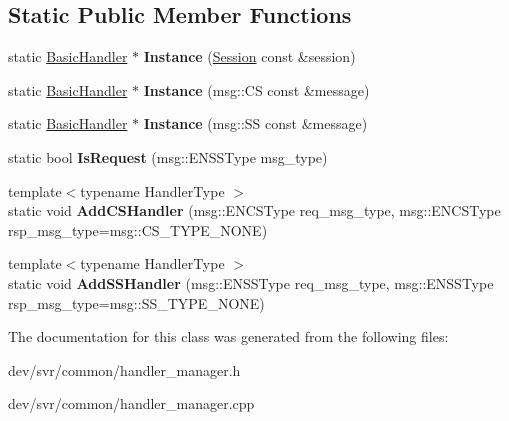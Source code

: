 \subsection*{Static Public Member Functions}
\begin{DoxyCompactItemize}
\item 
\hypertarget{classHandlerManager_abb5d79359d60109fd740b0d5784a9cdc}{
static \hyperlink{classBasicHandler}{BasicHandler} $\ast$ {\bfseries Instance} (\hyperlink{classSession}{Session} const \&session)}
\label{classHandlerManager_abb5d79359d60109fd740b0d5784a9cdc}

\item 
\hypertarget{classHandlerManager_a9edd3b5bff2f8ba85e881c9afdb2d1e6}{
static \hyperlink{classBasicHandler}{BasicHandler} $\ast$ {\bfseries Instance} (msg::CS const \&message)}
\label{classHandlerManager_a9edd3b5bff2f8ba85e881c9afdb2d1e6}

\item 
\hypertarget{classHandlerManager_ab28fbca3c32dd7c2b842e4ee72addf7d}{
static \hyperlink{classBasicHandler}{BasicHandler} $\ast$ {\bfseries Instance} (msg::SS const \&message)}
\label{classHandlerManager_ab28fbca3c32dd7c2b842e4ee72addf7d}

\item 
\hypertarget{classHandlerManager_ab611079886d53d01c7122850bf403f20}{
static bool {\bfseries IsRequest} (msg::ENSSType msg\_\-type)}
\label{classHandlerManager_ab611079886d53d01c7122850bf403f20}

\item 
\hypertarget{classHandlerManager_af30ab96bb15ad16cd90e008c133309e8}{
{\footnotesize template$<$typename HandlerType $>$ }\\static void {\bfseries AddCSHandler} (msg::ENCSType req\_\-msg\_\-type, msg::ENCSType rsp\_\-msg\_\-type=msg::CS\_\-TYPE\_\-NONE)}
\label{classHandlerManager_af30ab96bb15ad16cd90e008c133309e8}

\item 
\hypertarget{classHandlerManager_a8761357449137f777cb09cef21032dd5}{
{\footnotesize template$<$typename HandlerType $>$ }\\static void {\bfseries AddSSHandler} (msg::ENSSType req\_\-msg\_\-type, msg::ENSSType rsp\_\-msg\_\-type=msg::SS\_\-TYPE\_\-NONE)}
\label{classHandlerManager_a8761357449137f777cb09cef21032dd5}

\end{DoxyCompactItemize}


The documentation for this class was generated from the following files:\begin{DoxyCompactItemize}
\item 
dev/svr/common/handler\_\-manager.h\item 
dev/svr/common/handler\_\-manager.cpp\end{DoxyCompactItemize}
